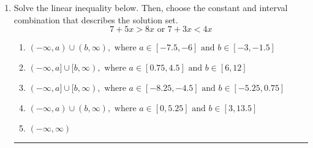 \documentclass[14pt]{extbook}
\newcommand{\litem}[1]{\item#1\hspace*{-1cm}\rule{\textwidth}{0.4pt}}
\begin{document}
\begin{enumerate}
{\begin{enumerate}[label=\Alph*.]
\end{enumerate} }
\litem{
Solve the linear inequality below. Then, choose the constant and interval combination that describes the solution set.\[ 7 + 5 x > 8 x \text{ or } 7 + 3 x < 4 x \]\begin{enumerate}[label=\Alph*.]
\item \( (-\infty, a) \cup (b, \infty), \text{ where } a \in [-7.5, -6] \text{ and } b \in [-3, -1.5] \)
\item \( (-\infty, a] \cup [b, \infty), \text{ where } a \in [0.75, 4.5] \text{ and } b \in [6, 12] \)
\item \( (-\infty, a] \cup [b, \infty), \text{ where } a \in [-8.25, -4.5] \text{ and } b \in [-5.25, 0.75] \)
\item \( (-\infty, a) \cup (b, \infty), \text{ where } a \in [0, 5.25] \text{ and } b \in [3, 13.5] \)
\item \( (-\infty, \infty) \)

\end{enumerate} }
\end{enumerate}
\end{document}
